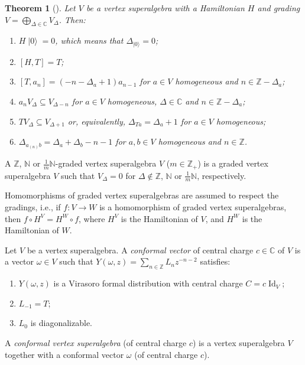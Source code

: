 \documentclass[a4paper, 12pt, reqno]{amsart}
\newtheorem{theorem}{Theorem}[section]
\theoremstyle{remark}
\numberwithin{equation}{subsection}
\DeclareMathOperator{\Id}{Id}
\DeclareMathOperator{\vac}{|0\rangle}
\begin{document}
\begin{theorem}[{\cite[\S4.9]{kac_vertex_1998}}]
  \label{thr:20}
  Let $V$ be a vertex superalgebra with a Hamiltonian $H$ and grading $V = \bigoplus_{\Delta \in \mathbb{C}}V_{\Delta}$.
  Then:
  \begin{enumerate}
  \item $H\vac = 0$, which means that $\Delta_{\vac} = 0$;
  \item $[H, T] = T$;
  \item $[T, a_n] = (-n - \Delta_a + 1)a_{n - 1}$ for $a \in V$ homogeneous and $n \in \mathbb{Z} - \Delta_a$;
  \item $a_nV_{\Delta} \subseteq V_{\Delta - n}$ for $a \in V$ homogeneous, $\Delta \in \mathbb{C}$ and $n \in \mathbb{Z} - \Delta_a$;
  \item $TV_{\Delta} \subseteq V_{\Delta + 1}$ or, equivalently, $\Delta_{Ta} = \Delta_a + 1$ for $a \in V$ homogeneous;
  \item $\Delta_{a_{(n)}b} = \Delta_a + \Delta_b - n - 1$ for $a, b \in V$ homogeneous and $n \in \mathbb{Z}$.
  \end{enumerate}
\end{theorem}

A $\mathbb{Z}$, $\mathbb{N}$ or $\frac{1}{m}\mathbb{N}$-graded vertex superalgebra $V$ ($m \in \mathbb{Z}_+$) is a graded vertex superalgebra $V$ such that $V_{\Delta} = 0$ for $\Delta \notin \mathbb{Z}$, $\mathbb{N}$ or $\frac{1}{m}\mathbb{N}$, respectively.

Homomorphisms of graded vertex superalgebras are assumed to respect the gradings, i.e., if $f: V \to W$ is a homomorphism of graded vertex superalgebras, then $f\circ H^V = H^W\circ f$, where $H^V$ is the Hamiltonian of $V$, and $H^W$ is the Hamiltonian of $W$.

Let $V$ be a vertex superalgebra.
A \emph{conformal vector} of central charge $c \in \mathbb{C}$ of $V$ is a vector $\omega \in V$ such that $Y(\omega, z) = \sum_{n \in \mathbb{Z}}L_nz^{-n - 2}$ satisfies:
\begin{enumerate}
\item $Y(\omega, z)$ is a Virasoro formal distribution with central charge $C = c\Id_V$;
\item $L_{-1} = T$;
\item $L_0$ is diagonalizable.
\end{enumerate}

A \emph{conformal vertex superalgebra} (of central charge $c$) is a vertex superalgebra $V$ together with a conformal vector $\omega$ (of central charge $c$).
\end{document}
